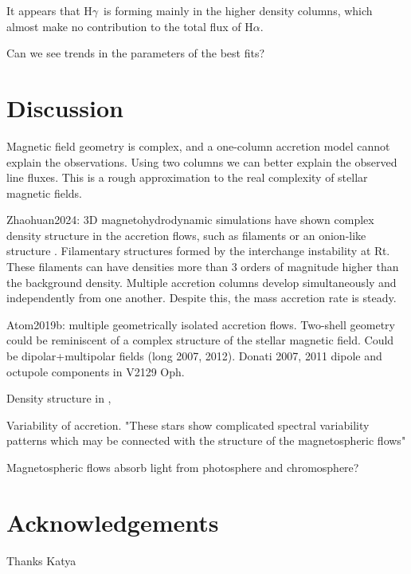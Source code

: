 \documentclass[twocolumn,linenumbers]{aastex631}
\newcommand{\halpha}{H$\alpha$}
\newcommand{\hgamma}{H$\gamma$}
\begin{document}
It appears that \hgamma\ is forming mainly in the higher density columns, which almost make no contribution to the total flux of \halpha. 

Can we see trends in the parameters of the best fits?

\section{Discussion} \label{Discussion}

Magnetic field geometry is complex, and a one-column accretion model cannot explain the observations. Using two columns we can better explain the observed line fluxes. This is a rough approximation to the real complexity of stellar magnetic fields.

Zhaohuan2024: 3D magnetohydrodynamic simulations have shown complex density structure in the accretion flows, such as filaments or an onion-like structure \citep{zhaohuan2024}. Filamentary structures formed by the interchange instability at Rt. These filaments can have densities more than 3 orders of magnitude higher than the background density. Multiple accretion columns develop simultaneously and independently from one another. Despite this, the mass accretion rate is steady.

Atom2019b: multiple geometrically isolated accretion flows. Two-shell geometry could be reminiscent of a complex structure of the stellar magnetic field. Could be dipolar+multipolar fields (long 2007, 2012). Donati 2007, 2011 dipole and octupole components in V2129 Oph.

Density structure in \citet{zhaohuan2024}, \citet{espaillat2021}

Variability of accretion. "These stars show complicated spectral variability patterns which may be connected with the structure of the magnetospheric flows" \citep{romanova2003}

Magnetospheric flows absorb light from photosphere and chromosphere? \citep{atom2023}

\section*{Acknowledgements}

Thanks Katya


{}

\end{document}
